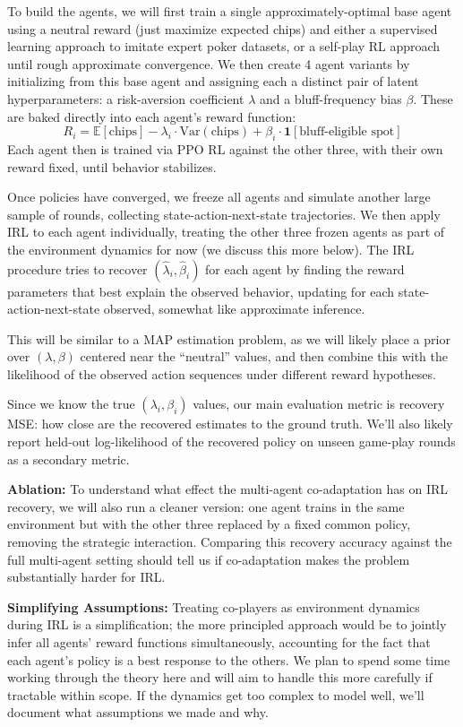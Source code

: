 \documentclass{article}
\begin{document}
To build the agents, we will first train a single approximately-optimal base agent using a neutral reward (just maximize expected chips) and either a supervised learning approach to imitate expert poker datasets, or a self-play RL approach until rough approximate convergence. We then create 4 agent variants by initializing
from this base agent and assigning each a distinct pair of latent hyperparameters: a risk-aversion
coefficient $\lambda$ and a bluff-frequency bias $\beta$. These are baked directly into each
agent's reward function:
\[
R_i = \mathbb{E}[\text{chips}] - \lambda_i \cdot \mathrm{Var}(\text{chips}) + \beta_i \cdot
\mathbf{1}[\text{bluff-eligible spot}]
\]
Each agent then is trained via PPO RL against
the other three, with their own reward fixed, until behavior stabilizes.

Once policies have converged, we freeze all agents and
simulate another large sample of rounds, collecting state-action-next-state trajectories. We then apply IRL
to each agent individually, treating the other three frozen agents as part of the environment dynamics
for now (we discuss this more below). The IRL procedure tries to recover $(\hat\lambda_i, \hat\beta_i)$
for each agent by finding the reward parameters that best explain the observed behavior, updating for each state-action-next-state observed, somewhat like approximate inference.

This will be similar to a MAP estimation problem, as we will likely place a prior over $(\lambda, \beta)$
centered near the ``neutral'' values,
and then combine this with the likelihood of the observed action sequences under different reward
hypotheses.

Since we know the true $(\lambda_i, \beta_i)$ values, our main evaluation metric
is recovery MSE: how close are the recovered estimates to the ground truth. We'll also likely report
held-out log-likelihood of the recovered policy on unseen game-play rounds as a secondary metric.

\textbf{Ablation:} To understand what effect the multi-agent co-adaptation has on IRL recovery, we
will also run a cleaner version: one agent trains in the same environment but with the other three replaced
by a fixed common policy, removing the strategic interaction. Comparing this recovery accuracy against the full multi-agent setting should tell us if
co-adaptation makes the problem substantially harder for IRL.

\textbf{Simplifying Assumptions:} Treating co-players as environment
dynamics during IRL is a simplification; the more principled approach would be to jointly infer all agents'
reward functions simultaneously, accounting for the fact that each agent's policy is a best response
to the others. We plan to spend some time working through the theory here and will aim to handle
this more carefully if tractable within scope. If the dynamics get too complex to model well,
we'll document what assumptions we made and why.
\end{document}

